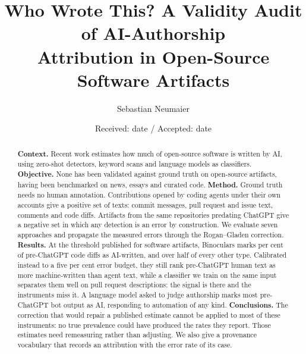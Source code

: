 \documentclass[smallextended,natbib]{svjour3}
\begin{document}
\title{Who Wrote This? A Validity Audit of AI-Authorship\\
       Attribution in Open-Source Software Artifacts}


\author{Sebastian Neumaier}


\date{Received: date / Accepted: date}

\maketitle

\begin{abstract}
\textbf{Context.} Recent work estimates how much of open-source software is written by
AI, using zero-shot detectors, keyword scans and language models as classifiers.
\textbf{Objective.} None has been validated against ground truth on open-source
artifacts, having been benchmarked on news, essays and curated code.
\textbf{Method.} Ground truth needs no human annotation. Contributions opened by
coding agents under their own accounts give a positive set of \PositiveTexts{} texts:
commit messages, pull request and issue text, comments and code diffs.
Artifacts from the same repositories predating ChatGPT give a negative set in which any
detection is an error by construction. We evaluate seven approaches and propagate the
measured errors through the Rogan--Gladen correction.
\textbf{Results.} At the threshold published for software artifacts, Binoculars marks
\PublishedBinoDiffFpr{} per cent of pre-ChatGPT code diffs as AI-written, and over half
of every other type. Calibrated instead to a five per cent error budget, they still rank pre-ChatGPT human text as more machine-written than
agent text, while a classifier we train on the same input separates them well on pull
request descriptions: the signal is there and the instruments miss it. A language model asked to judge authorship marks most pre-ChatGPT bot output
as AI, responding to automation of any kind.
\textbf{Conclusions.} The correction that would repair a published estimate cannot be
applied to most of these instruments: no true prevalence could have produced the rates
they report. Those estimates need remeasuring
rather than adjusting. We also give a provenance vocabulary that records an attribution
with the error rate of its case.
\end{abstract}
\end{document}
